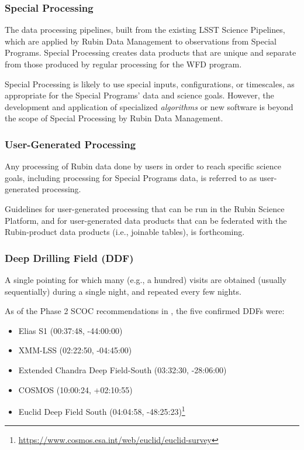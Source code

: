 \subsubsection{Special Processing}

The data processing pipelines, built from the existing LSST Science Pipelines, which are
applied by Rubin Data Management to observations from Special Programs.
Special Processing creates data products that are unique and separate from those produced
by regular processing for the WFD program.

Special Processing is likely to use special inputs, configurations, 
or timescales, as appropriate for the Special Programs' data and science goals.
However, the development and application of specialized \emph{algorithms} or new software
is beyond the scope of Special Processing by Rubin Data Management.

\subsubsection{User-Generated Processing}

Any processing of Rubin data done by users in order to reach specific science goals, including
processing for Special Programs data, is referred to as user-generated processing.

Guidelines for user-generated processing that can be run in the 
Rubin Science Platform, and for user-generated data products that can
be federated with the Rubin-product data products (i.e., joinable tables),
is forthcoming.


\subsubsection{Deep Drilling Field (DDF)}

A single pointing for which many (e.g., a hundred) visits are obtained 
(usually sequentially) during a single night, and repeated every few 
nights.

As of the Phase 2 SCOC recommendations in , the five 
confirmed DDFs were:

\begin{itemize}
\item Elias S1 (00:37:48, -44:00:00)
\item XMM-LSS (02:22:50, -04:45:00)
\item Extended Chandra Deep Field-South (03:32:30, -28:06:00)
\item COSMOS (10:00:24, +02:10:55)
\item Euclid Deep Field South  (04:04:58, -48:25:23)\footnote{\url{https://www.cosmos.esa.int/web/euclid/euclid-survey}}
\end{itemize}

